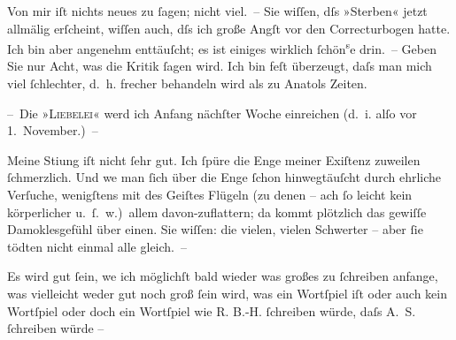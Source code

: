 \pstart
           Von mir iſt nichts neues zu{ }ſagen; nicht viel. – Sie wiſſen, dſs »Sterben« jetzt allmälig erſcheint, wiſſen auch, dſs ich große
               Angſt vor den Correctur{\pb}bogen hatte. Ich bin aber
               angenehm enttäuſcht; es ist einiges wirklich{ }ſchön\substVorne{}\textsuperscript{s}\substDazwischen{}e\substHinten{} drin. – Geben Sie nur Acht, was die Kritik{ }ſagen wird. Ich bin feſt
               überzeugt, daſs man mich viel{ }ſchlechter, d. h. frecher behandeln wird als zu Anatols Zeiten.\pend
           
\pstart
           – Die »\textsc{Liebelei}« werd ich Anfang nächſter Woche einreichen (d. i. alſo vor
                  1. November.) –\pend
           
\pstart
           Meine Sti{\geminationm}ung iſt nicht{ }ſehr gut. Ich{ }ſpüre die Enge
               meiner Exiſtenz zuweilen{ }ſchmerzlich. Und we{\geminationn} man{ }ſich
               über die Enge{ }ſchon hinwegtäuſcht durch ehrliche Verſuche, wenigſtens mit des Geiſtes
               Flügeln (zu denen – ach{ }ſo leicht kein körperlicher u. ſ. w.) allem davon-zu{\pb}flattern; da kommt plötzlich das gewiſſe
               Damoklesgefühl über einen. Sie wiſſen: die vielen, vielen Schwerter – aber{ }ſie tödten
               nicht einmal alle gleich. –\pend
           
\pstart
           Es wird gut{ }ſein, we{\geminationn} ich möglichſt bald wieder was
               großes zu{ }ſchreiben anfange, was vielleicht weder gut noch groß{ }ſein wird, was ein
               Wortſpiel iſt oder auch kein Wortſpiel oder doch ein Wortſpiel wie \textsc{R. B.-H.}{ }ſchreiben würde, daſs A. S.{ }ſchreiben würde –\pend
           
